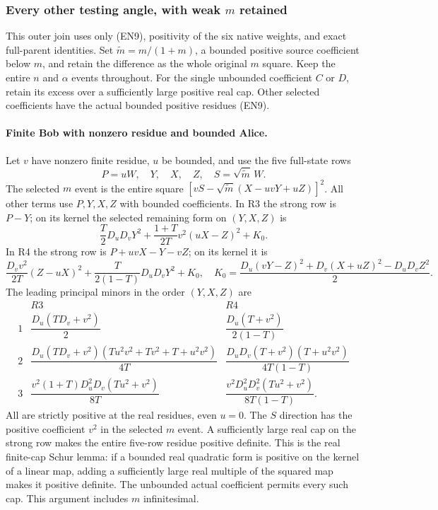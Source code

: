 \subsubsection*{Every other testing angle, with weak \(m\) retained}

This outer join uses only (EN9), positivity of the six native
weights, and exact full-parent identities. Set
$\widetilde m=m/(1+m)$, a bounded positive source coefficient below
$m$, and retain the difference as the whole original $m$ square.
Keep the entire $n$ and $\alpha$ events throughout.
For the single unbounded coefficient $C$ or $D$, retain its excess
over a sufficiently large positive real cap. Other selected
coefficients have the actual bounded positive residues (EN9).

\paragraph{Finite Bob with nonzero residue and bounded Alice.}
Let $v$ have nonzero finite residue, $u$ be bounded, and use the
five full-state rows
\[
P=uW,\quad Y,\quad X,\quad Z,\quad S=\sqrt{\widetilde m}\,W.
                                                               \tag{EN21}
\]
The selected $m$ event is the entire square
$[vS-\sqrt{\widetilde m}(X-uvY+uZ)]^2$.
All other terms use $P,Y,X,Z$ with bounded coefficients.
In R3 the strong row is $P-Y$; on its kernel the selected remaining
form on $(Y,X,Z)$ is
\[
\frac T2D_uD_vY^2+\frac{1+T}{2T}v^2(uX-Z)^2+K_0 .
\]
In R4 the strong row is $P+uvX-Y-vZ$; on its kernel it is
\[
\frac{D_vv^2}{2T}(Z-uX)^2+
\frac{T}{2(1-T)}D_uD_vY^2+K_0 ,
\quad
K_0=\frac{D_u(vY-Z)^2+D_v(X+uZ)^2-D_uD_vZ^2}{2}.
\]
The leading principal minors in the order $(Y,X,Z)$ are
\[
\begin{array}{c|c|c}
 &R3&R4\\ \hline
1&
\dfrac{D_u(TD_v+v^2)}2&
\dfrac{D_u(T+v^2)}{2(1-T)}\\[4pt]
2&
\dfrac{D_u(TD_v+v^2)(Tu^2v^2+Tv^2+T+u^2v^2)}{4T}&
\dfrac{D_uD_v(T+v^2)(T+u^2v^2)}{4T(1-T)}\\[4pt]
3&
\dfrac{v^2(1+T)D_u^2D_v(Tu^2+v^2)}{8T}&
\dfrac{v^2D_u^2D_v^2(Tu^2+v^2)}{8T(1-T)} .
\end{array}                                                    \tag{EN22}
\]
All are strictly positive at the real residues, even $u=0$.
The $S$ direction has the positive coefficient $v^2$ in the
selected $m$ event. A sufficiently large real cap on the strong
row makes the entire five-row residue positive definite.
This is the real finite-cap Schur lemma: if a bounded real
quadratic form is positive on the kernel of a linear map, adding
a sufficiently large real multiple of the squared map makes it
positive definite. The unbounded actual coefficient permits
every such cap. This argument includes $m$ infinitesimal.

